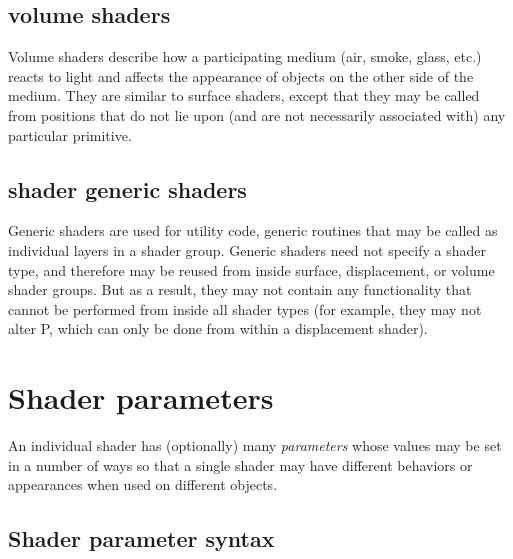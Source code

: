 \documentclass[11pt,letterpaper]{book}
\def\P{{\cf P}\xspace}
\begin{document}
\subsection*{{\cf volume} shaders}

Volume shaders describe how a participating medium (air, smoke, glass,
etc.) reacts to light and affects the appearance of objects on the other
side of the medium.  They are similar to {\cf surface} shaders, except
that they may be called from positions that do not lie upon (and are not
necessarily associated with) any particular primitive.

\begin{comment}
\subsection*{{\cf light} shaders}

Light shaders describe how much energy a light source deposits at a
given destination.
\end{comment}


\subsection*{{\cf shader} generic shaders}

Generic shaders are used for utility code, generic routines that may be
called as individual layers in a shader group.  Generic shaders need not
specify a shader type, and therefore may be reused from inside surface,
displacement, or volume shader groups.  But as a result, they may
not contain any functionality that cannot be performed from inside all
shader types (for example, they may not alter \P, which can only be done
from within a displacement shader).


\section{Shader parameters}
\label{sec:shaderparams}
 

An individual shader has (optionally) many \emph{parameters} whose
values may be set in a number of ways so that a single shader may have
different behaviors or appearances when used on different objects.

\subsection{Shader parameter syntax}
\end{document}

